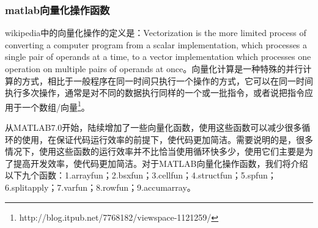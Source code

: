         \subsubsection{matlab向量化操作函数}
            \par
            wikipedia中的向量化操作的定义是：Vectorization is the more limited process of converting a computer program from a scalar implementation, which processes a single pair of operands at a time, to a vector implementation which processes one operation on multiple pairs of operands at once。向量化计算是一种特殊的并行计算的方式，相比于一般程序在同一时间只执行一个操作的方式，它可以在同一时间执行多次操作，通常是对不同的数据执行同样的一个或一批指令，或者说把指令应用于一个数组/向量\footnote{http://blog.itpub.net/7768182/viewspace-1121259/}。
            \par
            从MATLAB7.0开始，陆续增加了一些向量化函数，使用这些函数可以减少很多循环的使用，在保证代码运行效率的前提下，使代码更加简洁。需要说明的是，很多情况下，使用这些函数的运行效率并不比恰当使用循环快多少，使用它们主要是为了提高开发效率，使代码更加简洁。对于MATLAB向量化操作函数，我们将介绍以下九个函数：1.arrayfun；2.bsxfun；3.cellfun；4.structfun；5.spfun；6.splitapply；7.varfun；8.rowfun；9.accumarray。
